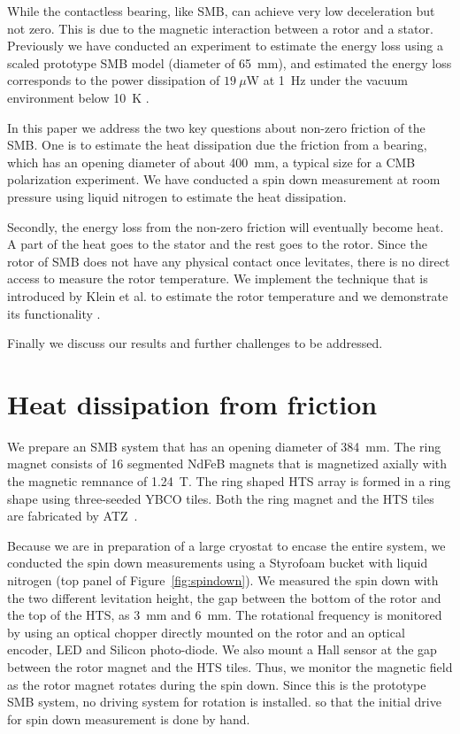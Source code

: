 \documentclass[journal]{IEEEtran}
\begin{document}
While the contactless bearing, like SMB, can achieve very low deceleration but not zero.
This is due to the magnetic interaction between a rotor and a stator.
Previously we have conducted an experiment to estimate the energy loss using a scaled prototype SMB model (diameter of 65~mm), and estimated the energy loss corresponds to the power dissipation of $19~\mu$W at 1~Hz under the vacuum environment below 10~K \cite{matsumura_eucas2015}.

In this paper we address the two key questions about non-zero friction of the SMB.
One is to estimate the heat dissipation due the friction from a bearing, which has an opening diameter of about 400~mm, a typical size for a CMB polarization experiment.
We have conducted a spin down measurement at room pressure using liquid nitrogen to estimate the heat dissipation.

Secondly, the energy loss from the non-zero friction will eventually become heat.
A part of the heat goes to the stator and the rest goes to the rotor.
Since the rotor of SMB does not have any physical contact once levitates, there is no direct access to measure the rotor temperature.
We implement the technique that is introduced by Klein et al. to estimate the rotor temperature and we demonstrate its functionality \cite{jklein}.

Finally we discuss our results and further challenges to be addressed.

\section{Heat dissipation from friction}
We prepare an SMB system that has an opening diameter of 384~mm.
The ring magnet consists of 16 segmented NdFeB magnets that is magnetized axially with the magnetic remnance of 1.24~T.
The ring shaped HTS array is formed in a ring shape using three-seeded YBCO tiles.
Both the ring magnet and the HTS tiles are fabricated by ATZ~\cite{atz}.

Because we are in preparation of a large cryostat to encase the entire system, we conducted the spin down measurements using a Styrofoam bucket with liquid nitrogen (top panel of Figure~\ref{fig:spindown}).
We measured the spin down with the two different levitation height, the gap between the bottom of the rotor and the top of the HTS, as 3~mm and 6~mm.
The rotational frequency is monitored by using an optical chopper directly mounted on the rotor and an optical encoder, LED and Silicon photo-diode.
We also mount a Hall sensor at the gap between the rotor magnet and the HTS tiles.
Thus, we monitor the magnetic field as the rotor magnet rotates during the spin down.
Since this is the prototype SMB system, no driving system for rotation is installed.
so that the initial drive for spin down measurement is done by hand.
\end{document}
